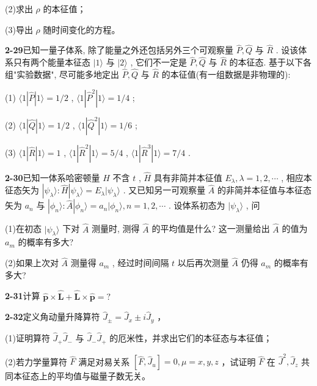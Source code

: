(2)求出 $\rho$ 的本征值；

(3)导出 $\rho$ 随时间变化的方程。

\vfill

\newpage
\vfill

\noindent
\textbf{2-29}\quad 已知一量子体系, 除了能量之外还包括另外三个可观察量 $\hat{P}, \hat{Q}$ 与 $\hat{R}$ . 设该体系只有两个能量本征态 $|1\rangle$ 与 $|2\rangle$ , 它们不一定是 $\hat{P}, \hat{Q}$ 与 $\hat{R}$ 的本征态. 基于以下各组"实验数据", 尽可能多地定出 $\hat{P}, \hat{Q}$ 与 $\hat{R}$ 的本征值(有一组数据是非物理的): 

(1) $\langle 1|\hat{P}|1\rangle = 1/2$ , $\langle 1|\hat{P}^2|1\rangle = 1/4$ ; 

(2) $\langle 1|\hat{Q}|1\rangle = 1/2$ , $\langle 1|\hat{Q}^2|1\rangle = 1/6$ ; 

(3) $\langle 1|\hat{R}|1\rangle = 1$ , $\langle 1|\hat{R}^2|1\rangle = 5/4$ , $\langle 1|\hat{R}^3|1\rangle = 7/4$ .

\vfill

\newpage
\vfill

\noindent
\textbf{2-30}\quad 已知一体系哈密顿量 $\hat{H}$ 不含 $t$ , $\hat{H}$ 具有非简并本征值 $E_{\lambda}, \lambda = 1, 2, \cdots$ , 相应本征态矢为 $|\psi_{\lambda}\rangle: \hat{H}|\psi_{\lambda}\rangle = E_{\lambda}|\psi_{\lambda}\rangle$ . 又已知另一可观察量 $\hat{A}$ 的非简并本征值与本征态矢为 $a_{n}$ 与 $|\phi_{n}\rangle: \hat{A}|\phi_{n}\rangle = a_{n}|\phi_{n}\rangle, n = 1, 2, \cdots$ . 设体系初态为 $|\psi_{\lambda}\rangle$ , 问

(1)在初态 $|\psi_{\lambda}\rangle$ 下对 $\hat{A}$ 测量时, 测得 $\hat{A}$ 的平均值是什么? 这一测量给出 $\hat{A}$ 的值为 $a_{m}$ 的概率有多大? 

(2)如果上次对 $\hat{A}$ 测量得 $a_{m}$ , 经过时间间隔 $t$ 以后再次测量 $\hat{A}$ 仍得 $a_{m}$ 的概率有多大?

\vfill

\newpage
\vfill

\noindent
\textbf{2-31}\quad 计算 $\hat{\pmb{p}}\times \hat{\pmb{L}} +\hat{\pmb{L}}\times \hat{\pmb{p}} = ?$

\vfill

\newpage
\vfill

\noindent
\textbf{2-32}\quad 定义角动量升降算符 $\hat{J}_{\pm} = \hat{J}_x \pm i\hat{J}_y$ ，

(1)证明算符 $\hat{J}_{+}\hat{J}_{-}$ 与 $\hat{J}_{-}\hat{J}_{+}$ 的厄米性，并求出它们的本征态与本征值；

(2)若力学量算符 $\hat{F}$ 满足对易关系 $[\hat{F}, \hat{J}_{u}] = 0, \mu = x, y, z$ ，试证明 $\hat{F}$ 在 $\hat{J}^2, \hat{J}_z$ 共同本征态上的平均值与磁量子数无关。

